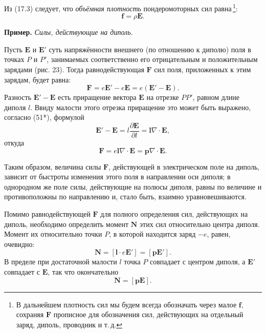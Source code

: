 \documentclass[a4paper,10pt]{article}
\begin{document}
Из (17.3) следует, что \textit{объёмная плотность} пондеромоторных
сил равна\,\footnote{В дальнейшем плотность сил мы будем всегда
обозначать через малое $\mathbf{f}$, сохраняя $\mathbf{F}$ прописное
для обозначения сил, действующих на отдельный заряд, диполь, проводник
и т.\,д.}:
\begin{equation}
    \mathbf{f} = \rho\mathbf{E}.
    \tag{17.4}
\end{equation}


\medskip
\noindent\textbf{Пример.} \textit{Силы, действующие на диполь.}

Пусть $\mathbf{E}$ и $\mathbf{E}'$ суть напряжённости внешнего (по
отношению к диполю) поля в точках $P$ и $P'$, занимаемых соответственно
его отрицательным и положительным зарядами (рис. 23). Тогда
равнодействующая $\mathbf{F}$ сил поля, приложенных к этим зарядам,
будет равна:
$$
    \mathbf{F} = e\mathbf{E}' - e\mathbf{E} = e(\mathbf{E}' - \mathbf{E}).
$$
Разность $\mathbf{E}' - \mathbf{E}$ есть приращение вектора $\mathbf{E}$
на отрезке $PP'$, равном длине диполя $l$. Ввиду малости этого отрезка
приращение это может быть выражено, согласно (51*), формулой
$$
    \mathbf{E}' - \mathbf{E} = l\frac{\partial\mathbf{E}}{\partial l}
    = \mathbf{l}\nabla\cdot\mathbf{E},
$$
откуда
\begin{equation}
    \mathbf{F} = e\mathbf{l}\nabla\cdot\mathbf{E}
              = \mathbf{p}\nabla\cdot\mathbf{E}.
    \tag{17.5}
\end{equation}

Таким образом, величина силы $\mathbf{F}$, действующей в электрическом
поле на диполь, зависит от быстроты изменения этого поля в направлении
оси диполя; в однородном же поле силы, действующие на полюсы диполя,
равны по величине и противоположны по направлению и, стало быть, взаимно
уравновешиваются.

Помимо равнодействующей $\mathbf{F}$ для полного определения сил,
действующих на диполь, необходимо определить момент $\mathbf{N}$ этих
сил относительно центра диполя. Момент их относительно точки $P$,
в которой находится заряд $-e$, равен, очевидно:
$$
    \mathbf{N} = [\mathbf{l}\cdot e\mathbf{E}'] = [\mathbf{p}\mathbf{E}'].
$$
В пределе при достаточной малости $l$ точка $P$ совпадает с центром
диполя, а $\mathbf{E}'$ совпадает с $\mathbf{E}$, так что окончательно
\begin{equation}
    \mathbf{N} = [\mathbf{p}\mathbf{E}].
    \tag{17.6}
\end{equation}
\end{document}
